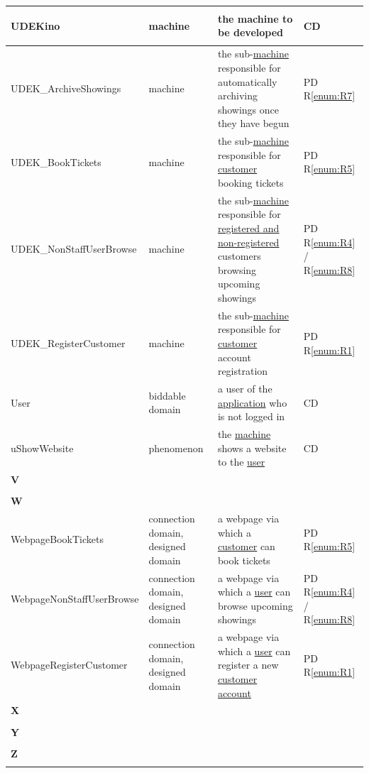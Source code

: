 \documentclass[a4paper,10pt,titlepage,bibtotoc,bibtotocnumbered]{scrreprt}
\begin{document}
\begin{longtable}{|l|p{3cm}|p{5cm}|l|}
\hline
\hypertarget{glossary:UDEKino}{UDEKino} & machine & the machine to be developed & CD\\
\hline
\hypertarget{glossary:UDEK-ArchiveShowings}{UDEK\_ArchiveShowings} & machine & the sub-\hyperlink{glossary:UDEKino}{machine} responsible for automatically archiving showings once they have begun & PD R\ref{enum:R7} \\
\hline
\hline
\hypertarget{glossary:UDEK-BookTickets}{UDEK\_BookTickets} & machine & the sub-\hyperlink{glossary:UDEKino}{machine} responsible for \hyperlink{glossary:Customer}{customer} booking tickets & PD R\ref{enum:R5}\\
\hline
\hypertarget{glossary:UDEK-NonStaffUserBrowse}{UDEK\_NonStaffUserBrowse} & machine & the sub-\hyperlink{glossary:UDEKino}{machine} responsible for \hyperlink{glossary:NonStaffUser}{registered and non-registered} customers browsing upcoming showings & PD R\ref{enum:R4} / R\ref{enum:R8}\\
\hline
\hypertarget{glossary:UDEK-RegisterCustomer}{UDEK\_RegisterCustomer} & machine & the sub-\hyperlink{glossary:UDEKino}{machine} responsible for \hyperlink{glossary:Customer}{customer} account registration & PD R\ref{enum:R1}\\
\hline
\hypertarget{glossary:User}{User} & biddable domain & a user of the \hyperlink{glossary:UDEKino}{application} who is not logged in & CD\\
\hline
\hypertarget{glossary:uShowWebsite}{uShowWebsite} & phenomenon & the \hyperlink{glossary:UDEKino}{machine} shows a website to the \hyperlink{glossary:User}{user} & CD\\
\hline
\multicolumn{4}{|l|}{\textbf{V}}\\
\hline
&  &  & \\
\hline
\multicolumn{4}{|l|}{\textbf{W}}\\
\hline
\hypertarget{glossary:WebpageBookTickets}{WebpageBookTickets} & connection domain, designed domain & a webpage via which a \hyperlink{glossary:Customer}{customer} can book tickets & PD R\ref{enum:R5}\\
\hline
\hypertarget{glossary:WebpageNonStaffUserBrowse}{WebpageNonStaffUserBrowse} & connection domain, designed domain & a webpage via which a \hyperlink{glossary:NonStaffUser}{user} can browse upcoming showings & PD R\ref{enum:R4} / R\ref{enum:R8}\\
\hline
\hypertarget{glossary:WebpageRegisterCustomer}{WebpageRegisterCustomer} & connection domain, designed domain & a webpage via which a \hyperlink{glossary:User}{user} can register a new \hyperlink{glossary:Customer}{customer account} & PD R\ref{enum:R1}\\
\hline
\multicolumn{4}{|l|}{\textbf{X}}\\
\hline
&  &  & \\
\hline
\multicolumn{4}{|l|}{\textbf{Y}}\\
\hline
&  &  & \\
\hline
\multicolumn{4}{|l|}{\textbf{Z}}\\
\hline
&  &  & \\
\hline
\end{longtable}
\end{document}

